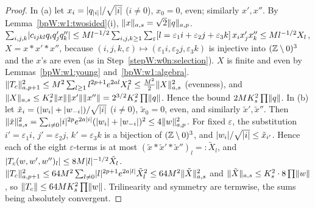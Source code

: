 \begin{proof}
\label{stepW:w1:maj1}
In (a) let $x_i=\lvert q_{\lvert i\rvert}\rvert/\sqrt{\lvert i\rvert}$ ($i\ne0$), $x_0=0$, even; similarly $x',x''$. By
Lemma~\ref{bpW:w1:twosided}(i), $\lVert x\rVert_{a,s}=\sqrt2\lVert q\rVert_{a,p}$.
\label{stepW:w1:sel1}
$\sum_{i,j,k}\lvert c_{ijkl}q_iq'_jq''_k\rvert\le Ml^{-1/2}\sum_{i,j,k\ge1}\sum_\varepsilon
[l=\varepsilon_1i+\varepsilon_2j+\varepsilon_3k]\,x_ix'_jx''_k\le Ml^{-1/2}X_l$, $X=x*x'*x''$, because
$(i,j,k,\varepsilon)\mapsto(\varepsilon_1i,\varepsilon_2j,\varepsilon_3k)$ is injective into $(\mathbb{Z}\setminus0)^3$ and the
$x$'s are even (as in Step~\ref{stepW:w0n:selection}). $X$ is finite and even by Lemmas~\ref{bpW:w1:young}
and~\ref{bpW:w1:algebra}.
\label{stepW:w1:smooth1}
$\lVert T_c\rVert_{a,p+1}^2\le M^2\sum_{l\ge1}l^{2p+1}e^{2al}X_l^2\le\frac{M^2}2\lVert X\rVert_{a,s}^2$ (evenness), and
$\lVert X\rVert_{a,s}\le K_s^2\lVert x\rVert\lVert x'\rVert\lVert x''\rVert=2^{3/2}K_s^2\prod\lVert q\rVert$. Hence the bound $2MK_s^2\prod\lVert q\rVert$.
\label{stepW:w1:maj2}
In (b) let $\tilde x_i=(\lvert w_i\rvert+\lvert w_{-i}\rvert)/\sqrt{\lvert i\rvert}$ ($i\ne0$), $\tilde x_0=0$, even, and similarly
$\tilde x',\tilde x''$. Then $\lVert \tilde x\rVert_{a,s}^2=\sum_{i\ne0}\lvert i\rvert^{2p}e^{2a\lvert i\rvert}(\lvert w_i\rvert+\lvert w_{-i}\rvert)^2\le
4\lVert w\rVert_{a,p}^2$.
\label{stepW:w1:sel2}
For fixed $\varepsilon$, the substitution $i'=\varepsilon_1i$, $j'=\varepsilon_2j$, $k'=\varepsilon_3k$ is a bijection
of $(\mathbb{Z}\setminus0)^3$, and $\lvert w_i\rvert/\sqrt{\lvert i\rvert}\le\tilde x_{i'}$. Hence each of the eight $\varepsilon$-terms is at
most $(\tilde x*\tilde x'*\tilde x'')_l=:\tilde X_l$, and $\lvert T_c(w,w',w'')_l\rvert\le8M\lvert l\rvert^{-1/2}\tilde X_l$.
\label{stepW:w1:smooth2}
$\lVert T_c\rVert^2_{a,p+1}\le64M^2\sum_{l\ne0}\lvert l\rvert^{2p+1}e^{2a\lvert l\rvert}\tilde X_l^2\le64M^2\lVert \tilde X\rVert_{a,s}^2$ and
$\lVert \tilde X\rVert_{a,s}\le K_s^2\cdot8\prod\lVert w\rVert$, so $\lVert T_c\rVert\le64MK_s^2\prod\lVert w\rVert$. Trilinearity and symmetry are
termwise, the sums being absolutely convergent.
\end{proof}

